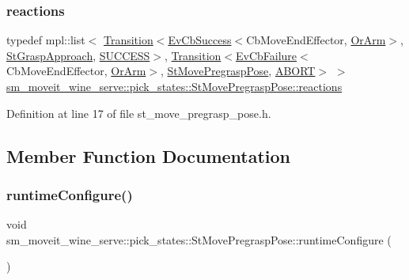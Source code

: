 \subsubsection{\texorpdfstring{reactions}{reactions}}
{\footnotesize\ttfamily typedef mpl\+::list$<$ \hyperlink{classsmacc_1_1Transition}{Transition}$<$\hyperlink{structsmacc_1_1EvCbSuccess}{Ev\+Cb\+Success}$<$Cb\+Move\+End\+Effector, \hyperlink{classsm__moveit__wine__serve_1_1OrArm}{Or\+Arm}$>$, \hyperlink{structsm__moveit__wine__serve_1_1pick__states_1_1StGraspApproach}{St\+Grasp\+Approach}, \hyperlink{structsmacc_1_1default__transition__tags_1_1SUCCESS}{S\+U\+C\+C\+E\+SS}$>$, \hyperlink{classsmacc_1_1Transition}{Transition}$<$\hyperlink{structsmacc_1_1EvCbFailure}{Ev\+Cb\+Failure}$<$Cb\+Move\+End\+Effector, \hyperlink{classsm__moveit__wine__serve_1_1OrArm}{Or\+Arm}$>$, \hyperlink{structsm__moveit__wine__serve_1_1pick__states_1_1StMovePregraspPose}{St\+Move\+Pregrasp\+Pose}, \hyperlink{structsmacc_1_1default__transition__tags_1_1ABORT}{A\+B\+O\+RT}$>$ $>$ \hyperlink{structsm__moveit__wine__serve_1_1pick__states_1_1StMovePregraspPose_aa46f2ef812aaadc6815e623701534fef}{sm\+\_\+moveit\+\_\+wine\+\_\+serve\+::pick\+\_\+states\+::\+St\+Move\+Pregrasp\+Pose\+::reactions}}



Definition at line 17 of file st\+\_\+move\+\_\+pregrasp\+\_\+pose.\+h.



\subsection{Member Function Documentation}
\mbox{\label{structsm__moveit__wine__serve_1_1pick__states_1_1StMovePregraspPose_a9dc0fd16ec45943f8d66c3f29dc7b082}} 
\subsubsection{\texorpdfstring{runtime\+Configure()}{runtimeConfigure()}}
{\footnotesize\ttfamily void sm\+\_\+moveit\+\_\+wine\+\_\+serve\+::pick\+\_\+states\+::\+St\+Move\+Pregrasp\+Pose\+::runtime\+Configure (\begin{DoxyParamCaption}{ }\end{DoxyParamCaption})\hspace{0.3cm}{\ttfamily [inline]}}



